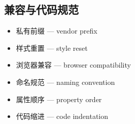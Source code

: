 \subsection{兼容与代码规范}
\begin{itemize}
\item 私有前缀 — vendor prefix
\item 样式重置 — style reset
\item 浏览器兼容 — browser compatibility
\item 命名规范 — naming convention
\item 属性顺序 — property order
\item 代码缩进 — code indentation
\end{itemize}
